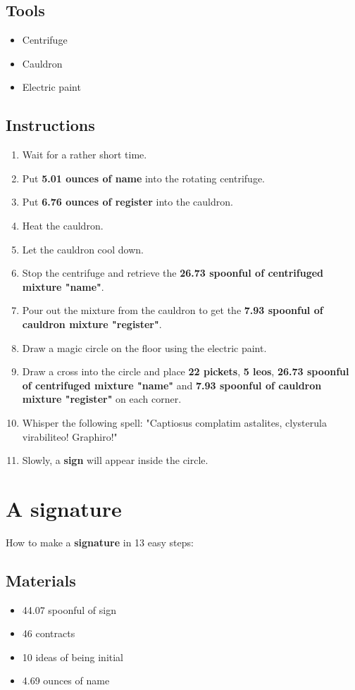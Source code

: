 \documentclass{article}
\begin{document}
\subsection{Tools}\begin{itemize}
\item 
Centrifuge
\item 
Cauldron
\item 
Electric paint
\end{itemize}
\subsection{Instructions}\begin{enumerate}
\item 
Wait for a rather short time.
\item 
Put \textbf{5.01 ounces of name} into the rotating centrifuge.
\item 
Put \textbf{6.76 ounces of register} into the cauldron.
\item 
Heat the cauldron.
\item 
Let the cauldron cool down.
\item 
Stop the centrifuge and retrieve the \textbf{26.73 spoonful of centrifuged mixture "name"}.
\item 
Pour out the mixture from the cauldron to get the \textbf{7.93 spoonful of cauldron mixture "register"}.
\item 
Draw a magic circle on the floor using the electric paint.
\item 
Draw a cross into the circle and place \textbf{22 pickets}, \textbf{5 leos}, \textbf{26.73 spoonful of centrifuged mixture "name"} and \textbf{7.93 spoonful of cauldron mixture "register"} on each corner.
\item 
Whisper the following spell: "Captiosus complatim astalites, clysterula virabiliteo! Graphiro!"
\item 
Slowly, a \textbf{sign} will appear inside the circle.
\end{enumerate}
\newpage
\section{A signature}How to make a \textbf{signature} in 13 easy steps:

\subsection{Materials}\begin{itemize}
\item 
44.07 spoonful of sign
\item 
46 contracts
\item 
10 ideas of being initial
\item 
4.69 ounces of name
\end{itemize}
\end{document}
